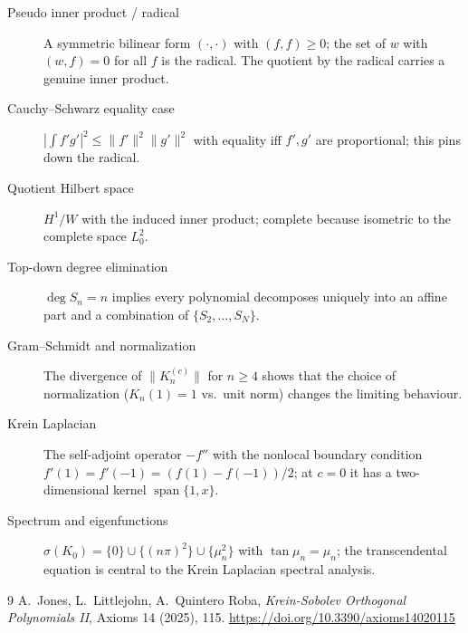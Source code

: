 ﻿\documentclass[11pt]{article}
\begin{document}
\begin{description}
	\item[Pseudo inner product / radical] A symmetric bilinear form
	$(\cdot,\cdot)$ with $(f,f)\ge0$; the set of $w$ with
	$(w,f)=0$ for all $f$ is the radical.  The quotient by the radical
	carries a genuine inner product.
	\item[Cauchy--Schwarz equality case] $|\int f'g'|^2\le
	\|f'\|^2\|g'\|^2$ with equality iff $f',g'$ are proportional; this pins
	down the radical.
	\item[Quotient Hilbert space] $H^1/W$ with the induced inner product;
	complete because isometric to the complete space $L^2_0$.
	\item[Top-down degree elimination] $\deg S_n=n$ implies every
	polynomial decomposes uniquely into an affine part and a combination of
	$\{S_2,\ldots,S_N\}$.
	\item[Gram--Schmidt and normalization] The divergence of
	$\|K_n^{(c)}\|$ for $n\ge4$ shows that the choice of normalization
	($K_n(1)=1$ vs.\ unit norm) changes the limiting behaviour.
	\item[Krein Laplacian] The self-adjoint operator $-f''$ with the
	nonlocal boundary condition $f'(1)=f'(-1)=(f(1)-f(-1))/2$; at $c=0$ it
	has a two-dimensional kernel $\operatorname{span}\{1,x\}$.
	\item[Spectrum and eigenfunctions] $\sigma(K_0)=\{0\}\cup\{(n\pi)^2\}
	\cup\{\mu_n^2\}$ with $\tan\mu_n=\mu_n$; the transcendental equation is
	central to the Krein Laplacian spectral analysis.
\end{description}

\begin{thebibliography}{9}
 A.~Jones, L.~Littlejohn, A.~Quintero Roba,
	\emph{Krein-Sobolev Orthogonal Polynomials II}, Axioms 14 (2025), 115.
	\url{https://doi.org/10.3390/axioms14020115}
\end{thebibliography}
\end{document}
